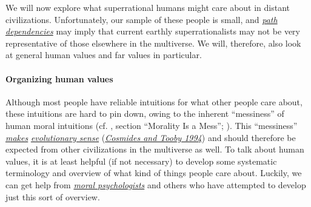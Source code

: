 We will now explore what superrational humans might care about in
distant civilizations. Unfortunately, our sample of these people is
small, and
\href{https://en.wikipedia.org/wiki/Path_dependence}{\emph{path
dependencies}} may imply that current earthly superrationalists may not
be very representative of those elsewhere in the multiverse. We will,
therefore, also look at general human values and far values in
particular.

\hypertarget{organizing-human-values}{\paragraph{Organizing human
values}\label{organizing-human-values}}

Although most people have reliable intuitions for what other people care
about, these intuitions are hard to pin down, owing to the inherent
``messiness'' of human moral intuitions (cf.
\parencite{Stewart-Williams2015-gg}, section ``Morality Is a
Mess''; \parencite{Muehlhauser2012-ib}). This ``messiness''
\href{http://lesswrong.com/lw/l3/thou_art_godshatter/}{\emph{makes}}
\href{https://en.wikipedia.org/wiki/Modularity_of_mind\#Evolutionary_psychology_and_massive_modularity}{\emph{evolutionary
sense}}
(\href{http://citeseerx.ist.psu.edu/viewdoc/download?doi=10.1.1.140.7758\&rep=rep1\&type=pdf}{\emph{Cosmides
and Tooby 1994}}) and should therefore be expected from other
civilizations in the multiverse as well. To talk about human values, it
is at least helpful (if not necessary) to develop some systematic
terminology and overview of what kind of things people care about.
Luckily, we can get help from
\href{https://en.wikipedia.org/wiki/Moral_psychology}{\emph{moral
psychologists}} and others who have attempted to develop just this sort
of overview.

